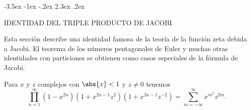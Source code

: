 \documentclass[12pt,a4paper]{book}
\makeatletter
\renewcommand\section{\@startsection{section}{1}{\z@}%
  {-3.5ex \@plus -1ex \@minus -.2ex}%
  {2.3ex \@plus .2ex}%
  {\normalfont\Large\bfseries\raggedright}}
\makeatother
\begin{document}
    \section{IDENTIDAD DEL TRIPLE PRODUCTO DE JACOBI}

    Esta sección describe una identidad famosa de la teoría de la función zeta debida a Jacobi.
    El teorema de los números pentagonales de Euler y muchas otras identidades con particiones
    se obtienen como casos especiales de la fórmula de Jacobi.

    \begin{teorema}\label{teo:14-6}
        Para $x$ y $z$ complejos con $\abs{x}<1$ y $z\neq0$ tenemos
        \begin{equation}\label{eq:14-13}
            \prod_{n=1}^{\infty}(1-x^{2n})(1+x^{2n-1}z^{2})(1+x^{2n-1}z^{-2})=\sum_{m=-\infty}^{\infty}x^{m^{2}}z^{2m}.
        \end{equation}
    \end{teorema}
\end{document}
